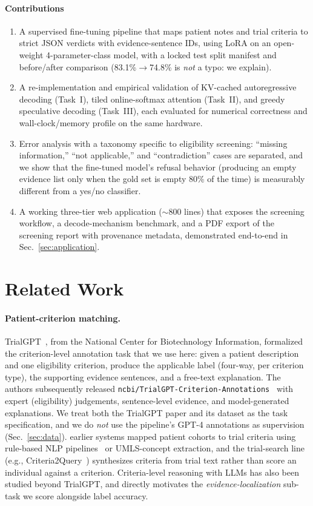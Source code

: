 \documentclass[conference]{IEEEtran}
\newcommand{\dataset}{\texttt{ncbi/TrialGPT-Criterion-Annotations}}
\begin{document}
\paragraph*{Contributions}
\begin{enumerate}[leftmargin=*, itemsep=1pt, topsep=2pt]
\item A supervised fine-tuning pipeline that maps patient notes and
trial criteria to strict JSON verdicts with evidence-sentence IDs, using
LoRA on an open-weight 4-parameter-class model, with a locked test
split manifest and before/after comparison (83.1\%$\to$74.8\%
is \emph{not} a typo: we explain).
\item A re-implementation and empirical validation of KV-cached
autoregressive decoding (Task~I), tiled online-softmax attention
(Task~II), and greedy speculative decoding (Task~III), each evaluated
for numerical correctness and wall-clock/memory profile on the same
hardware.
\item Error analysis with a taxonomy specific to eligibility
screening: ``missing information,'' ``not applicable,'' and
``contradiction''
cases are separated, and we show that the fine-tuned model's refusal
behavior (producing an empty evidence list only when the gold set is
empty 80\% of the time) is measurably different from a yes/no
classifier.
\item A working three-tier web application ($\sim$800 lines) that
exposes the screening workflow, a decode-mechanism benchmark, and a
PDF export of the screening report with provenance metadata,
demonstrated end-to-end in Sec.~\ref{sec:application}.
\end{enumerate}

\section{Related Work}
\label{sec:related}

\paragraph*{Patient-criterion matching.}
TrialGPT~\cite{id1}, from the National Center for Biotechnology
Information, formalized the criterion-level annotation task that we use
here: given a patient description and one eligibility criterion, produce
the applicable label (four-way, per criterion type), the supporting
evidence sentences, and a free-text explanation. The authors
subsequently released \dataset{}~\cite{id2} with expert
(eligibility) judgements, sentence-level evidence, and
model-generated explanations. We treat both the TrialGPT paper and its
dataset as the task specification, and we do \emph{not} use the
pipeline's GPT-4 annotations as supervision (Sec.~\ref{sec:data}).
earlier systems mapped patient cohorts to trial criteria using
rule-based NLP pipelines~\cite{id5} or UMLS-concept extraction, and the
trial-search line (e.g., Criteria2Query~\cite{id5}) synthesizes
criteria from trial text rather than score an individual against a
criterion. Criteria-level reasoning with LLMs has also been studied
beyond TrialGPT, and directly motivates the
\emph{evidence-localization} sub-task we score alongside label accuracy.
\end{document}
